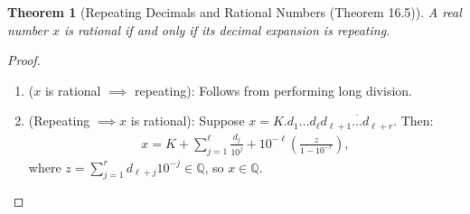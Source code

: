 \documentclass[7pt]{article}
\theoremstyle{definition}
\newtheorem{definition}{Definition}
\theoremstyle{plain}
\newtheorem{theorem}{Theorem}
\begin{document}



\begin{theorem}[Repeating Decimals and Rational Numbers (Theorem 16.5)]
A real number $ x $ is rational if and only if its decimal expansion is repeating.
\end{theorem}

\begin{proof}

\begin{enumerate}
    \item ($ x $ is rational $ \implies $ repeating): Follows from performing long division.
    \item (Repeating $ \implies x $ is rational): Suppose $ x = K .d_1 \ldots d_\ell \overline{d_{\ell+1} \ldots d_{\ell+r}} $. Then:
    \begin{align}
    x = K + \sum_{j=1}^\ell \frac{d_j}{10^j} + 10^{-\ell} \left( \frac{z}{1 - 10^{-r}} \right),
    \end{align}
    where $ z = \sum_{j=1}^r d_{\ell+j} 10^{-j} \in \mathbb{Q} $, so $ x \in \mathbb{Q} $.
\end{enumerate}
\end{proof}
\end{document}

